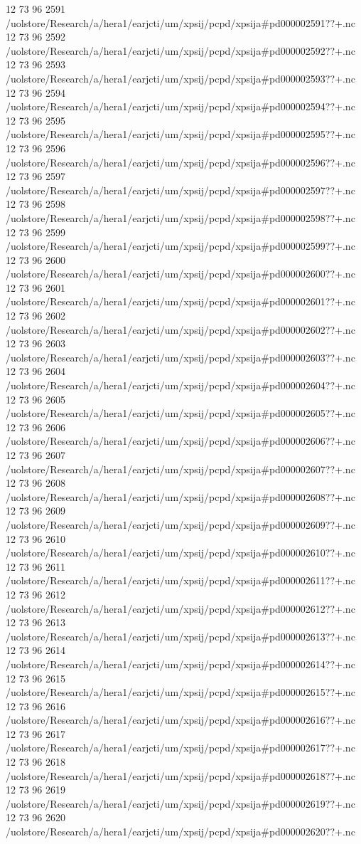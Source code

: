 12 73 96
2591
/uolstore/Research/a/hera1/earjcti/um/xpsij/pcpd/xpsija#pd000002591??+.nc
12 73 96
2592
/uolstore/Research/a/hera1/earjcti/um/xpsij/pcpd/xpsija#pd000002592??+.nc
12 73 96
2593
/uolstore/Research/a/hera1/earjcti/um/xpsij/pcpd/xpsija#pd000002593??+.nc
12 73 96
2594
/uolstore/Research/a/hera1/earjcti/um/xpsij/pcpd/xpsija#pd000002594??+.nc
12 73 96
2595
/uolstore/Research/a/hera1/earjcti/um/xpsij/pcpd/xpsija#pd000002595??+.nc
12 73 96
2596
/uolstore/Research/a/hera1/earjcti/um/xpsij/pcpd/xpsija#pd000002596??+.nc
12 73 96
2597
/uolstore/Research/a/hera1/earjcti/um/xpsij/pcpd/xpsija#pd000002597??+.nc
12 73 96
2598
/uolstore/Research/a/hera1/earjcti/um/xpsij/pcpd/xpsija#pd000002598??+.nc
12 73 96
2599
/uolstore/Research/a/hera1/earjcti/um/xpsij/pcpd/xpsija#pd000002599??+.nc
12 73 96
2600
/uolstore/Research/a/hera1/earjcti/um/xpsij/pcpd/xpsija#pd000002600??+.nc
12 73 96
2601
/uolstore/Research/a/hera1/earjcti/um/xpsij/pcpd/xpsija#pd000002601??+.nc
12 73 96
2602
/uolstore/Research/a/hera1/earjcti/um/xpsij/pcpd/xpsija#pd000002602??+.nc
12 73 96
2603
/uolstore/Research/a/hera1/earjcti/um/xpsij/pcpd/xpsija#pd000002603??+.nc
12 73 96
2604
/uolstore/Research/a/hera1/earjcti/um/xpsij/pcpd/xpsija#pd000002604??+.nc
12 73 96
2605
/uolstore/Research/a/hera1/earjcti/um/xpsij/pcpd/xpsija#pd000002605??+.nc
12 73 96
2606
/uolstore/Research/a/hera1/earjcti/um/xpsij/pcpd/xpsija#pd000002606??+.nc
12 73 96
2607
/uolstore/Research/a/hera1/earjcti/um/xpsij/pcpd/xpsija#pd000002607??+.nc
12 73 96
2608
/uolstore/Research/a/hera1/earjcti/um/xpsij/pcpd/xpsija#pd000002608??+.nc
12 73 96
2609
/uolstore/Research/a/hera1/earjcti/um/xpsij/pcpd/xpsija#pd000002609??+.nc
12 73 96
2610
/uolstore/Research/a/hera1/earjcti/um/xpsij/pcpd/xpsija#pd000002610??+.nc
12 73 96
2611
/uolstore/Research/a/hera1/earjcti/um/xpsij/pcpd/xpsija#pd000002611??+.nc
12 73 96
2612
/uolstore/Research/a/hera1/earjcti/um/xpsij/pcpd/xpsija#pd000002612??+.nc
12 73 96
2613
/uolstore/Research/a/hera1/earjcti/um/xpsij/pcpd/xpsija#pd000002613??+.nc
12 73 96
2614
/uolstore/Research/a/hera1/earjcti/um/xpsij/pcpd/xpsija#pd000002614??+.nc
12 73 96
2615
/uolstore/Research/a/hera1/earjcti/um/xpsij/pcpd/xpsija#pd000002615??+.nc
12 73 96
2616
/uolstore/Research/a/hera1/earjcti/um/xpsij/pcpd/xpsija#pd000002616??+.nc
12 73 96
2617
/uolstore/Research/a/hera1/earjcti/um/xpsij/pcpd/xpsija#pd000002617??+.nc
12 73 96
2618
/uolstore/Research/a/hera1/earjcti/um/xpsij/pcpd/xpsija#pd000002618??+.nc
12 73 96
2619
/uolstore/Research/a/hera1/earjcti/um/xpsij/pcpd/xpsija#pd000002619??+.nc
12 73 96
2620
/uolstore/Research/a/hera1/earjcti/um/xpsij/pcpd/xpsija#pd000002620??+.nc
